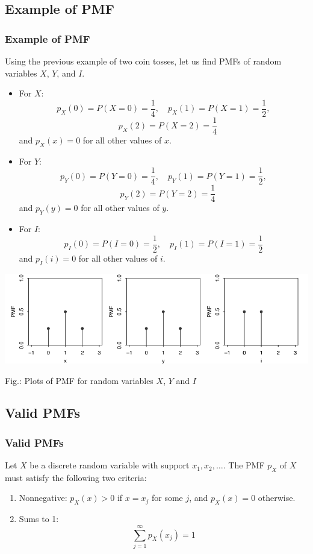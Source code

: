 \documentclass{beamer}
\begin{document}
\subsection{Example of PMF}
\begin{frame}
    \frametitle{Example of PMF}
    Using the previous example of two coin tosses, let us find PMFs of random variables $X$, $Y$, and $I$.
    \begin{itemize}
        \item For $X$:
        $$p_X (0) = P (X = 0) = \frac{1}{4}, \quad p_X (1) = P (X = 1) = \frac{1}{2},$$ $$ \quad p_X (2) = P (X = 2) = \frac{1}{4}$$
        and $p_X (x) = 0$ for all other values of $x$.
        
        \item For $Y$:
        \[p_Y (0) = P (Y = 0) = \frac{1}{4}, \quad p_Y (1) = P (Y = 1) = \frac{1}{2},\] \[ \quad p_Y (2) = P (Y = 2) = \frac{1}{4}\]
        and $p_Y (y) = 0$ for all other values of $y$.
    \end{itemize} 
\end{frame}


\begin{frame}
    \begin{itemize}
        \item For $I$:
        $$p_I (0) = P (I = 0) = \frac{1}{2}, \quad p_I (1) = P (I = 1) = \frac{1}{2}$$
        and $p_I (i) = 0$ for all other values of $i$.
    \end{itemize}
    
    \includegraphics[width=1\textwidth]{pmf.png}
    
    Fig.: Plots of PMF for random variables $X$, $Y$ and $I$

\end{frame}
        
\subsection{Valid PMFs}
\begin{frame}
    \frametitle{Valid PMFs}
    Let $X$ be a discrete random variable with support $x_1, x_2, \ldots$. The PMF $p_X$ of $X$ must satisfy the following two criteria:
    \begin{enumerate}
        \item Nonnegative: $p_X (x) > 0$ if $x = x_j$ for some $j$, and $p_X (x) = 0$ otherwise.
        \item Sums to 1: 
        $$\sum_{j=1}^{\infty} p_X(x_j) = 1$$
    \end{enumerate}
\end{frame}
\end{document}
